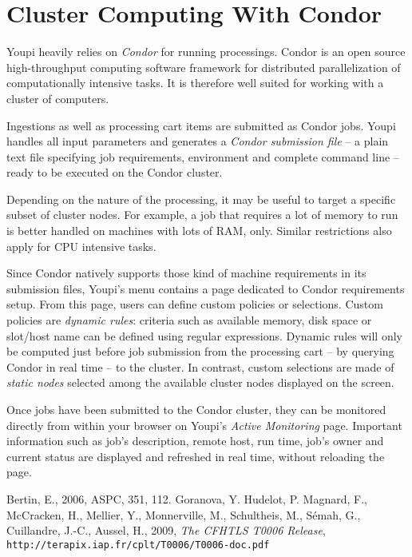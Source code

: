 \documentclass[11pt,twoside]{article}  %
\begin{document}
\section{Cluster Computing With Condor}

Youpi heavily relies on \emph{Condor} for running processings. Condor is an open source 
high-throughput computing software framework for distributed parallelization of computationally 
intensive tasks. It is therefore well suited for working with a cluster of computers.

Ingestions as well as processing cart items are submitted as Condor jobs. Youpi handles all 
input parameters and generates a \emph{Condor submission file} -- a plain text file specifying 
job requirements, environment and complete command line -- ready to be executed on the Condor cluster.

Depending on the nature of the processing, it may be useful to target a specific subset of cluster 
nodes. For example, a job that requires a lot of memory to run is better handled on machines with 
lots of RAM, only. Similar restrictions also apply for CPU intensive tasks.

Since Condor natively supports those kind of machine requirements in its submission files, Youpi's 
menu contains a page dedicated to Condor requirements setup. From this page, users can define 
custom policies or selections. Custom policies are \emph{dynamic rules}: criteria such as 
available memory, disk space or slot/host name can be defined using regular expressions. Dynamic 
rules will only be computed just before job submission from the processing cart -- by querying 
Condor in real time -- to the cluster. In contrast, custom selections are made of \emph{static nodes} 
selected among the available cluster nodes displayed on the screen.

Once jobs have been submitted to the Condor cluster, they can be monitored directly from within 
your browser on Youpi's \emph{Active Monitoring} page. Important information such as job's 
description, remote host, run time, job's owner and current status are displayed and refreshed 
in real time, without reloading the page.

\begin{references}

 Bertin, E., 2006, ASPC, 351, 112. 
 Goranova, Y. Hudelot, P. Magnard, F., McCracken, H.,
 Mellier, Y., Monnerville, M., Schultheis, M., S\'emah, G., Cuillandre, J.-C., Aussel, H., 2009, {\it The CFHTLS T0006 Release},
 {\tt http://terapix.iap.fr/cplt/T0006/T0006-doc.pdf}\\
    
\end{references}

\end{document}
